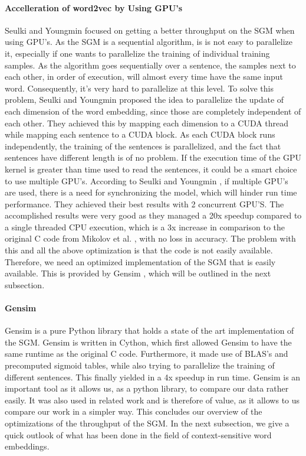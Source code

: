 \documentclass[conference]{IEEEtran}
\begin{document}
\paragraph{Accelleration of word2vec by Using GPU's}
Seulki and Youngmin \cite{gpu} focused on getting a better throughput on the SGM when using GPU's. As the SGM is a sequential algorithm, is is not easy to parallelize it, especially if one wants to parallelize the training of individual training samples. As the algorithm goes sequentially over a sentence, the samples next to each other, in order of execution, will almost every time have the same input word. Consequently, it's very hard to parallelize at this level. To solve this problem, Seulki and Youngmin \cite{gpu} proposed the idea to parallelize the update of each dimension of the word embedding, since those are completely independent of each other. They achieved this by mapping each dimension to a CUDA thread while mapping each sentence to a CUDA block. As each CUDA block runs independently, the training of the sentences is parallelized, and the fact that sentences have different length is of no problem. If the execution time of the GPU kernel is greater than time used to read the sentences, it could be a smart choice to use multiple GPU's. According to Seulki and Youngmin \cite{gpu}, if multiple GPU's are used, there is a need for synchronizing the model, which will hinder run time performance. They achieved their best results with 2 concurrent GPU'S. The accomplished results were very good as they managed a 20x speedup compared to a single threaded CPU execution, which is a 3x increase in comparison to the original C code from Mikolov et al. \cite{mikolov2}, with no loss in accuracy. The problem with this and all the above optimization is that the code is not easily available. Therefore, we need an optimized implementation of the SGM that is easily available. This is provided by Gensim \cite{gensim}, which will be outlined in the next subsection.
\paragraph{Gensim}\label{ssec:gensim}
Gensim \cite{gensim} is a pure Python library that holds a state of the art implementation of the SGM. Gensim is written in Cython, which first allowed Gensim to have the same runtime as the original C code. Furthermore, it made use of BLAS's and precomputed sigmoid tables, while also trying to parallelize the training of different sentences. This finally yielded in a 4x speedup in run time. Gensim is an important tool as it allows us, as a python library, to compare our data rather easily. It was also used in related work \cite{intel} and is therefore of value, as it allows to us compare our work in a simpler way. This concludes our overview of the optimizations of the throughput of the SGM. In the next subsection, we give a quick outlook of what has been done in the field of context-sensitive word embeddings.
\end{document}
